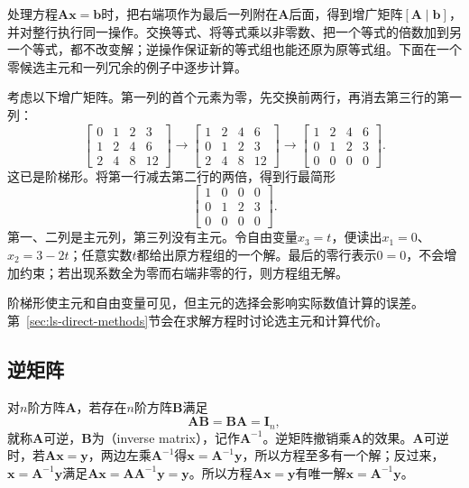 处理方程$\bm A\bm x=\bm b$时，把右端项作为最后一列附在$\bm A$后面，得到增广矩阵$[\bm A\mid\bm b]$，并对整行执行同一操作。交换等式、将等式乘以非零数、把一个等式的倍数加到另一个等式，都不改变解；逆操作保证新的等式组也能还原为原等式组。下面在一个零候选主元和一列冗余的例子中逐步计算。
\begin{example}[换行、消元与自由变量]
\label{ex:ls-elementary-row-reduction}
考虑以下增广矩阵。第一列的首个元素为零，先交换前两行，再消去第三行的第一列：
\[
 \left[\begin{array}{ccc|c}0&1&2&3\\1&2&4&6\\2&4&8&12\end{array}\right]
 \longrightarrow
 \left[\begin{array}{ccc|c}1&2&4&6\\0&1&2&3\\2&4&8&12\end{array}\right]
 \longrightarrow
 \left[\begin{array}{ccc|c}1&2&4&6\\0&1&2&3\\0&0&0&0\end{array}\right].
\]
这已是阶梯形。将第一行减去第二行的两倍，得到行最简形
\[
 \left[\begin{array}{ccc|c}1&0&0&0\\0&1&2&3\\0&0&0&0\end{array}\right].
\]
第一、二列是主元列，第三列没有主元。令自由变量$x_3=t$，便读出$x_1=0$、$x_2=3-2t$；任意实数$t$都给出原方程组的一个解。最后的零行表示$0=0$，不会增加约束；若出现系数全为零而右端非零的行，则方程组无解。
\end{example}

阶梯形使主元和自由变量可见，但主元的选择会影响实际数值计算的误差。第~\ref{sec:ls-direct-methods}节会在求解方程时讨论选主元和计算代价。

\subsection{逆矩阵}
\label{sec:prelim-inverse-matrices}

对$n$阶方阵$\bm A$，若存在$n$阶方阵$\bm B$满足
\[
 \bm A\bm B=\bm B\bm A=\bm I_n,
\]
就称$\bm A$可逆，$\bm B$为（inverse matrix），记作$\bm A^{-1}$。逆矩阵撤销乘$\bm A$的效果。$\bm A$可逆时，若$\bm A\bm x=\bm y$，两边左乘$\bm A^{-1}$得$\bm x=\bm A^{-1}\bm y$，所以方程至多有一个解；反过来，$\bm x=\bm A^{-1}\bm y$满足$\bm A\bm x=\bm A\bm A^{-1}\bm y=\bm y$。所以方程$\bm A\bm x=\bm y$有唯一解$\bm x=\bm A^{-1}\bm y$。

